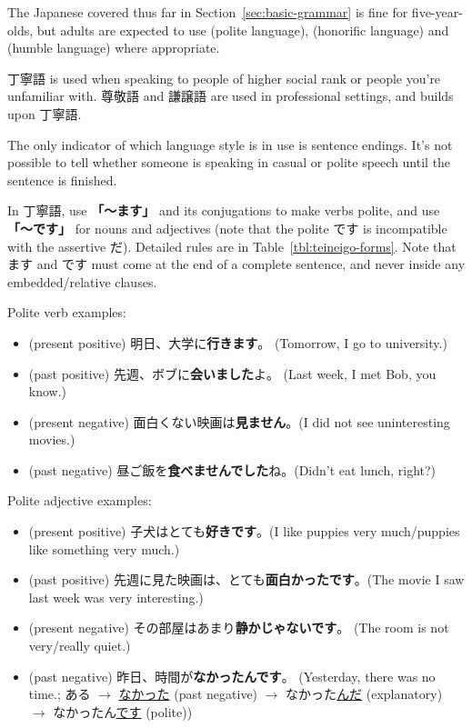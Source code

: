 \documentclass[../nihongo-gakushuu-kyouzai.tex]{subfiles}
\begin{document}
The Japanese covered thus far in Section~\ref{sec:basic-grammar} is fine for five-year-olds, but adults are expected to use  (polite language),  (honorific language) and  (humble language) where appropriate.

丁寧語 is used when speaking to people of higher social rank or people you're unfamiliar with. 尊敬語 and 謙譲語 are used in professional settings, and builds upon 丁寧語.

The only indicator of which language style is in use is sentence endings. It's not possible to tell whether someone is speaking in casual or polite speech until the sentence is finished.

In 丁寧語, use \textbf{「〜ます」} and its conjugations to make verbs polite, and use \textbf{「〜です」} for nouns and adjectives (note that the polite です is incompatible with the assertive だ). Detailed rules are in Table~\ref{tbl:teineigo-forms}. Note that ます and です must come at the end of a complete sentence, and never inside any embedded/relative clauses.

Polite verb examples:
\begin{itemize}
    \item (present positive) 明日、大学に\textbf{行きます}。 (Tomorrow, I go to university.)
    \item (past positive) 先週、ボブに\textbf{会いました}よ。 (Last week, I met Bob, you know.)
    \item (present negative) 面白くない映画は\textbf{見ません}。(I did not see uninteresting movies.)
    \item (past negative) 昼ご飯を\textbf{食べませんでした}ね。(Didn't eat lunch, right?)
\end{itemize}

Polite adjective examples:
\begin{itemize}
    \item (present positive) 子犬はとても\textbf{好きです}。(I like puppies very much/puppies like something very much.)
    \item (past positive) 先週に見た映画は、とても\textbf{面白かったです}。(The movie I saw last week was very interesting.)
    \item (present negative) その部屋はあまり\textbf{静かじゃないです}。 (The room is not very/really quiet.)
    \item (past negative) 昨日、時間が\textbf{なかったんです}。 (Yesterday, there was no time.; ある $\to$ \ul{なかった} (past negative) $\to$ なかった\ul{んだ} (explanatory) $\to$ なかったん\ul{です} (polite))
\end{itemize}
\end{document}
